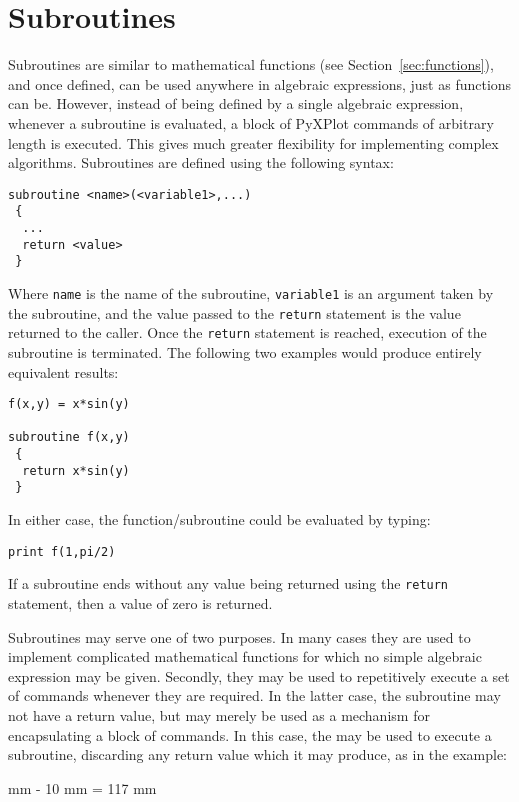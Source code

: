 \section{Subroutines}
\label{sec:subroutines}

Subroutines are similar to mathematical functions (see
Section~\ref{sec:functions}), and once defined, can be used anywhere in
algebraic expressions, just as functions can be.  However, instead of being
defined by a single algebraic expression, whenever a subroutine is evaluated, a
block of PyXPlot commands of arbitrary length is executed. This gives much
greater flexibility for implementing complex algorithms. Subroutines are
defined using the following syntax:
\begin{verbatim}
subroutine <name>(<variable1>,...)
 {
  ...
  return <value>
 }
\end{verbatim}
Where {\tt name} is the name of the subroutine, {\tt variable1} is an argument
taken by the subroutine, and the value passed to the {\tt return} statement is
the value returned to the caller. Once the {\tt return} statement is reached,
execution of the subroutine is terminated. The following two examples would
produce entirely equivalent results:
\begin{verbatim}
f(x,y) = x*sin(y)

subroutine f(x,y)
 {
  return x*sin(y)
 }
\end{verbatim}
In either case, the function/subroutine could be evaluated by typing:
\begin{verbatim}
print f(1,pi/2)
\end{verbatim}
If a subroutine ends without any value being returned using the {\tt return}
statement, then a value of zero is returned.

Subroutines may serve one of two purposes. In many cases they are used to
implement complicated mathematical functions for which no simple algebraic
expression may be given. Secondly, they may be used to repetitively execute a
set of commands whenever they are required. In the latter case, the subroutine
may not have a return value, but may merely be used as a mechanism for
encapsulating a block of commands.  In this case, the  may be
used to execute a subroutine, discarding any return value which it may produce,
as in the example:

\vspace{3mm}
\newline
{}\newline
{}\newline
{}
\vspace{3mm}\newline
{}\newline
{}\newline
{} mm - 10 mm = 117 mm
\vspace{3mm}

